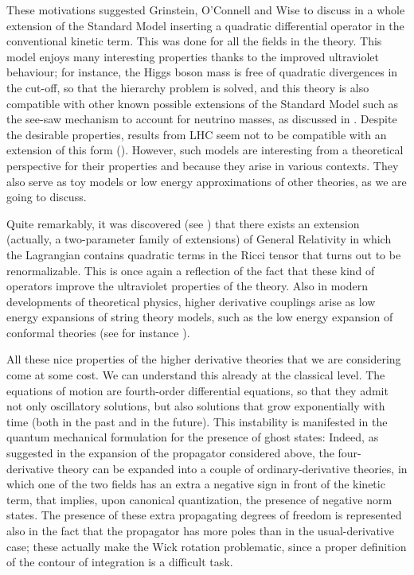 These motivations suggested Grinstein, O'Connell and Wise  to  discuss in \cite{Grinstein:2007mp,Grinstein:2007iz,Grinstein:2008qq,Wise:2009mi} a whole extension of the Standard Model  inserting a quadratic differential operator in the conventional kinetic term. This was done for all the fields in the theory.
This model enjoys many interesting properties thanks to the improved ultraviolet behaviour; for instance, the Higgs boson mass is free of quadratic divergences in the cut-off, so that the hierarchy problem is solved, and this theory is also compatible with other known possible extensions of the Standard Model such as the see-saw mechanism to account for neutrino masses, as discussed in \cite{Espinosa:2007ny}. Despite the desirable properties, results from LHC seem not to be compatible with an extension of this form (\cite{Rizzo:2007ae}).
However, such models are interesting from a theoretical perspective for their properties and because they arise in various contexts. They also serve as toy models or low energy approximations of other theories, as we are going to discuss. 




Quite remarkably, it was discovered (see \cite{Stelle:1976gc,Fradkin:1981iu,Avram}) that there exists an extension (actually, a two-parameter family of extensions) of General Relativity in which the Lagrangian contains quadratic terms in the Ricci tensor that turns out to be renormalizable. This is once again a reflection of the fact that these kind of operators improve the ultraviolet properties of the theory. Also in modern developments of theoretical physics, higher derivative couplings arise as low energy expansions of string theory models, such as the low energy expansion of conformal theories (see for instance \cite{Stelle:1978, Buchbinder:1999jn}).





All these nice properties of the higher derivative theories that we are considering come at some cost. 
We can understand this already at the classical level. The equations of motion  are fourth-order differential equations, so that they admit not only oscillatory solutions, but also solutions that grow exponentially with time (both in the past and in the future). This instability is manifested in the quantum mechanical formulation for the presence of ghost states: Indeed, as suggested in the expansion of the propagator considered above, the four-derivative theory can be expanded into a couple of ordinary-derivative theories, in which one of the two fields has an extra a negative sign in front of the kinetic term, that implies, upon canonical quantization, the presence of negative norm states.
The presence of these extra propagating degrees of freedom is represented also in the fact that the propagator has more poles than in the usual-derivative case; these actually make the Wick rotation problematic, since a proper definition of the contour of integration is a difficult task.





